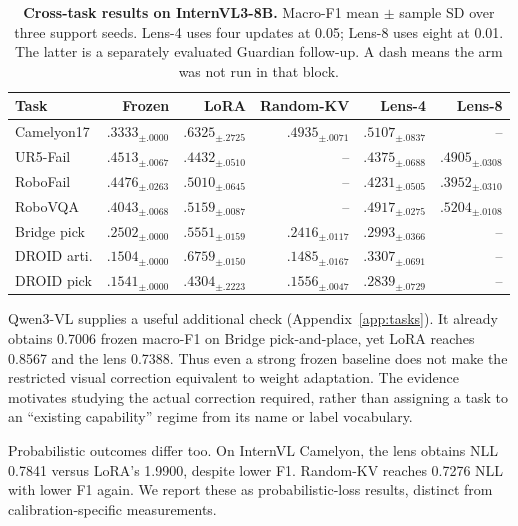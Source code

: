 \documentclass{article}
\begin{document}
\begin{table}[t]
\caption{\textbf{Cross-task results on InternVL3-8B.} Macro-F1 mean $\pm$ sample SD over three support seeds. Lens-4 uses four updates at 0.05; Lens-8 uses eight at 0.01. The latter is a separately evaluated Guardian follow-up. A dash means the arm was not run in that block.}
\label{tab:tasks}
\centering\small
\begin{tabular}{@{}lrrrrr@{}}
\toprule
Task & Frozen & LoRA & Random-KV & Lens-4 & Lens-8\\
\midrule
Camelyon17 & $.3333_{\pm.0000}$ & $\mathbf{.6325}_{\pm.2725}$ & $.4935_{\pm.0071}$ & $.5107_{\pm.0837}$ & --\\
UR5-Fail & $.4513_{\pm.0067}$ & $.4432_{\pm.0510}$ & -- & $.4375_{\pm.0688}$ & $\mathbf{.4905}_{\pm.0308}$\\
RoboFail & $.4476_{\pm.0263}$ & $\mathbf{.5010}_{\pm.0645}$ & -- & $.4231_{\pm.0505}$ & $.3952_{\pm.0310}$\\
RoboVQA & $.4043_{\pm.0068}$ & $.5159_{\pm.0087}$ & -- & $.4917_{\pm.0275}$ & $\mathbf{.5204}_{\pm.0108}$\\
Bridge pick & $.2502_{\pm.0000}$ & $\mathbf{.5551}_{\pm.0159}$ & $.2416_{\pm.0117}$ & $.2993_{\pm.0366}$ & --\\
DROID arti. & $.1504_{\pm.0000}$ & $\mathbf{.6759}_{\pm.0150}$ & $.1485_{\pm.0167}$ & $.3307_{\pm.0691}$ & --\\
DROID pick & $.1541_{\pm.0000}$ & $\mathbf{.4304}_{\pm.2223}$ & $.1556_{\pm.0047}$ & $.2839_{\pm.0729}$ & --\\
\bottomrule
\end{tabular}
\end{table}

Qwen3-VL supplies a useful additional check (Appendix~\ref{app:tasks}). It already obtains 0.7006 frozen macro-F1 on Bridge pick-and-place, yet LoRA reaches 0.8567 and the lens 0.7388. Thus even a strong frozen baseline does not make the restricted visual correction equivalent to weight adaptation. The evidence motivates studying the actual correction required, rather than assigning a task to an ``existing capability'' regime from its name or label vocabulary.

Probabilistic outcomes differ too. On InternVL Camelyon, the lens obtains NLL 0.7841 versus LoRA's 1.9900, despite lower F1. Random-KV reaches 0.7276 NLL with lower F1 again. We report these as probabilistic-loss results, distinct from calibration-specific measurements.
\end{document}
